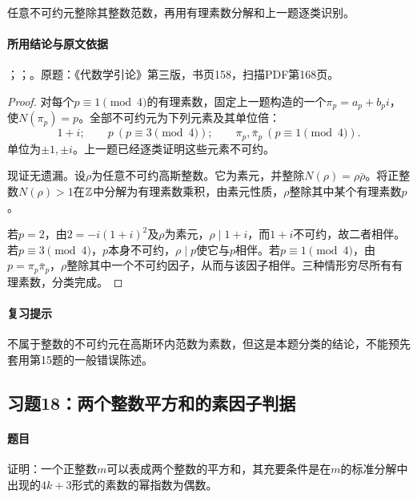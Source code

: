 任意不可约元整除其整数范数，再用有理素数分解和上一题逐类识别。

\paragraph{所用结论与原文依据}

；；。原题：《代数学引论》第三版，书页158，扫描PDF第168页。


\begin{proof}

对每个$p\equiv1\pmod4$的有理素数，固定上一题构造的一个$\pi_p=a_p+b_pi$，使$N(\pi_p)=p$。全部不可约元为下列元素及其单位倍：
\[
1+i;\qquad p\ (p\equiv3\pmod4);\qquad
\pi_p,\bar\pi_p\ (p\equiv1\pmod4).
\]
单位为$\pm1,\pm i$。上一题已经逐类证明这些元素不可约。

现证无遗漏。设$\rho$为任意不可约高斯整数。它为素元，并整除$N(\rho)=\rho\bar\rho$。将正整数$N(\rho)>1$在$\mathbb Z$中分解为有理素数乘积，由素元性质，$\rho$整除其中某个有理素数$p$。

若$p=2$，由$2=-i(1+i)^2$及$\rho$为素元，$\rho\mid1+i$，而$1+i$不可约，故二者相伴。若$p\equiv3\pmod4$，$p$本身不可约，$\rho\mid p$使它与$p$相伴。若$p\equiv1\pmod4$，由$p=\pi_p\bar\pi_p$，$\rho$整除其中一个不可约因子，从而与该因子相伴。三种情形穷尽所有有理素数，分类完成。

\end{proof}

\paragraph{复习提示}

不属于整数的不可约元在高斯环内范数为素数，但这是本题分类的结论，不能预先套用第15题的一般错误陈述。

\subsection{习题18：两个整数平方和的素因子判据}

\label{ex:4:18}

\paragraph{题目}

证明：一个正整数$m$可以表成两个整数的平方和，其充要条件是在$m$的标准分解中出现的$4k+3$形式的素数的幂指数为偶数。

